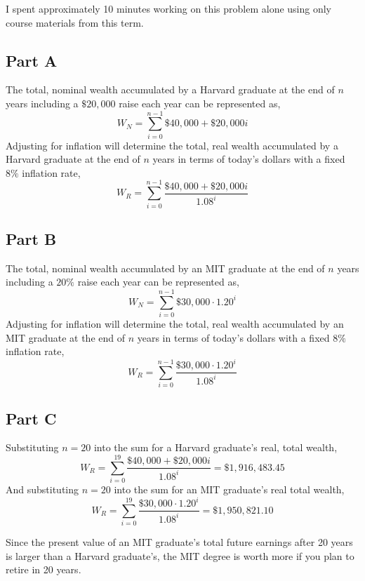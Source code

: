 \documentclass{article}
\begin{document}
I spent approximately 10 minutes working on this problem alone using only course
materials from this term.

\subsection*{Part A}

The total, nominal wealth accumulated by a Harvard graduate at the end of $n$
years including a $\$20,000$ raise each year can be represented as,
$$ W_N = \sum\limits_{i = 0}^{n - 1} \$40,000 + \$20,000 i $$
Adjusting for inflation will determine the total, real wealth accumulated by a
Harvard graduate at the end of $n$ years in terms of today's dollars with a
fixed $8\%$ inflation rate,
$$ W_R = \sum\limits_{i = 0}^{n - 1} \frac{\$40,000 + \$20,000 i}{1.08^i} $$

\break

\subsection*{Part B}

The total, nominal wealth accumulated by an MIT graduate at the end of  $n$
years including a $20\%$ raise each year can be represented as,
$$ W_N = \sum\limits_{i = 0}^{n - 1} \$30,000 \cdot 1.20^i $$
Adjusting for inflation will determine the total, real wealth accumulated by an
MIT graduate at the end of $n$ years in terms of today's dollars with a fixed
$8\%$ inflation rate,
$$ W_R = \sum\limits_{i = 0}^{n - 1} \frac{\$30,000 \cdot 1.20^i}{1.08^i} $$

\break

\subsection*{Part C}

Substituting $n = 20$ into the sum for a Harvard graduate's real, total wealth,
$$ W_R = \sum\limits_{i = 0}^{19} \frac{\$40,000 + \$20,000 i}{1.08^i} =
\$1,916,483.45 $$
And substituting $n = 20$ into the sum for an MIT graduate's real total wealth,
$$ W_R = \sum\limits_{i = 0}^{19} \frac{\$30,000 \cdot 1.20^i}{1.08^i} =
\$1,950,821.10 $$

Since the present value of an MIT graduate's total future earnings after 20
years is larger than a Harvard graduate's, the MIT degree is worth more if you
plan to retire in 20 years.
\end{document}
